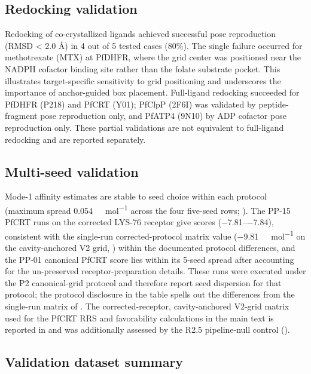 \documentclass[journal=jcisd8,manuscript=suppinfo]{achemso}
\begin{document}
\subsection{Redocking validation}\label{sec:sm_val_redock}


Redocking of co-crystallized ligands achieved successful pose reproduction (RMSD < 2.0 \si{\angstrom}) in 4 out of 5 tested cases (80\%). The single failure occurred for methotrexate (MTX) at PfDHFR, where the grid center was positioned near the NADPH cofactor binding site rather than the folate substrate pocket. This illustrates target-specific sensitivity to grid positioning and underscores the importance of anchor-guided box placement. Full-ligand redocking succeeded for PfDHFR (P218) and PfCRT (Y01); PfClpP (2F6I) was validated by peptide-fragment pose reproduction only, and PfATP4 (9N10) by ADP cofactor pose reproduction only. These partial validations are not equivalent to full-ligand redocking and are reported separately.

\subsection{Multi-seed validation}\label{sec:sm_val_multiseed}


Mode-1 affinity estimates are stable to seed choice within each protocol (maximum spread \num{0.054}~\si{\kilo\calorie\per\mole} across the four five-seed rows; ). The PP-15 PfCRT runs on the corrected LYS-76 receptor give scores (\numrange{-7.81}{-7.84}), consistent with the single-run corrected-protocol matrix value (\num{-9.81}~\si{\kilo\calorie\per\mole} on the cavity-anchored V2 grid, ) within the documented protocol differences, and the PP-01 canonical PfCRT score lies within its 5-seed spread after accounting for the un-preserved receptor-preparation details. These runs were executed under the P2 canonical-grid protocol and therefore report seed dispersion for that protocol; the protocol disclosure in the table spells out the differences from the single-run matrix of . The corrected-receptor, cavity-anchored V2-grid matrix used for the PfCRT RRS and favorability calculations in the main text is reported in  and was additionally assessed by the R2.5 pipeline-null control ().

\subsection{Validation dataset summary}\label{sec:sm_val_datasets}

\end{document}
